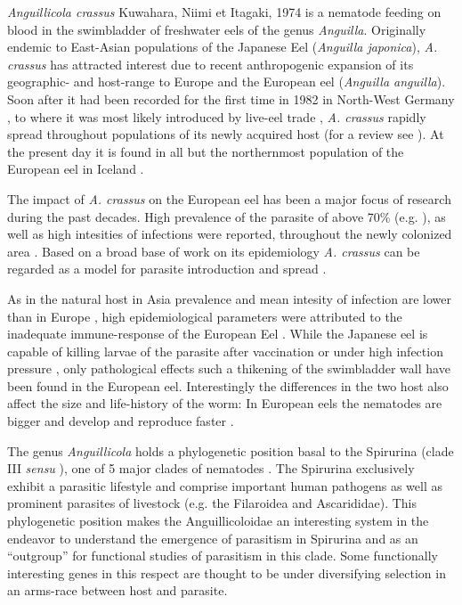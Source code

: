 \documentclass[10pt]{bmc_article}
\newenvironment{bmcformat}{\begin{raggedright}\baselineskip20pt\sloppy\setboolean{publ}{false}}{\end{raggedright}\baselineskip20pt\sloppy}
\begin{document}
\begin{bmcformat}
\textit{Anguillicola crassus} Kuwahara, Niimi et Itagaki, 1974
\cite{kuwahara_Niimi_Itagaki_1974} is a nematode feeding on blood in
the swimbladder of freshwater eels of the genus
\textit{Anguilla}. Originally endemic to East-Asian populations of the
Japanese Eel (\textit{Anguilla japonica}), \textit{A. crassus} has
attracted interest due to recent anthropogenic expansion of its
geographic- and host-range to Europe and the European eel
(\textit{Anguilla anguilla}). Soon after it had been recorded for the
first time in 1982 in North-West Germany \cite{fischer_teichwirt}, to
where it was most likely introduced by live-eel trade
\cite{koops_anguillicola-infestations_1989, koie_swimbladder_1991},
\textit{A. crassus} rapidly spread throughout populations of its newly
acquired host (for a review see \cite{kirk_impact_2003}). At the
present day it is found in all but the northernmost population of the
European eel in Iceland \cite{kristmundsson_parasite_2007}.

The impact of \textit{A. crassus} on the European eel has been a major
focus of research during the past decades. High prevalence of the
parasite of above 70\% (e.g. \cite{wrtz_distribution_1998}), as well
as high intesities of infections were reported, throughout the newly
colonized area \cite{lefebvre_anguillicolosis:_2004}.  Based on a
broad base of work on its epidemiology \textit{A. crassus} can be
regarded as a model for parasite introduction and spread
\cite{taraschewski_hosts_2007}.

As in the natural host in Asia prevalence and mean intesity of
infection are lower than in Europe \cite{mnderle_occurrence_2006},
high epidemiological parameters were attributed to the inadequate
immune-response of the European Eel
\cite{knopf_swimbladder_2006}. While the Japanese eel is capable of
killing larvae of the parasite after vaccination
\cite{knopf_vaccination_2008} or under high infection pressure
\cite{heitlinger_massive_2009}, only pathological effects such a
thikening of the swimbladder wall \cite{wrtz_histopathological_2000}
have been found in the European eel. Interestingly the differences in
the two host also affect the size and life-history of the worm: In
European eels the nematodes are bigger and develop and reproduce
faster \cite{knopf_differences_2004}.

The genus \textit{Anguillicola} holds a phylogenetic position basal to
the Spirurina (clade III \textit{sensu}
\cite{blaxter_molecular_1998}), one of 5 major clades of nematodes
\cite{nadler_molecular_2007, wijov_evolutionary_2006}. The Spirurina
exclusively exhibit a parasitic lifestyle and comprise important human
pathogens as well as prominent parasites of livestock (e.g. the
Filaroidea and Ascarididae). This phylogenetic position makes the
Anguillicoloidae an interesting system in the endeavor to understand
the emergence of parasitism in Spirurina and as an ``outgroup'' for
functional studies of parasitism in this clade. Some functionally
interesting genes in this respect are thought to be under diversifying
selection in an arms-race between host and
parasite\cite{zang_serine_2001}.


\end{bmcformat}
\end{document}
